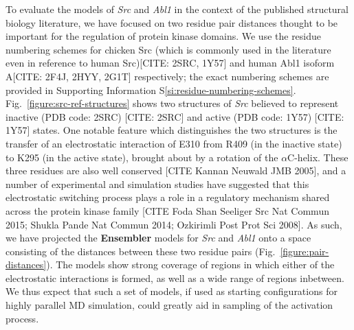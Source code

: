 \documentclass[aps,pre,twocolumn,nofootinbib,superscriptaddress,linenumbers]{revtex4-1}
\begin{document}
To evaluate the models of \emph{Src} and \emph{Abl1} in the context of the published structural biology literature, we have focused on two residue pair distances thought to be important for the regulation of protein kinase domains.
We use the residue numbering schemes for chicken Src (which is commonly used in the literature even in reference to human Src)[CITE: 2SRC, 1Y57] and human Abl1 isoform A[CITE: 2F4J, 2HYY, 2G1T] respectively; the exact numbering schemes are provided in Supporting Information S\ref{si:residue-numbering-schemes}.
Fig.~\ref{figure:src-ref-structures} shows two structures of \emph{Src} believed to represent inactive (PDB code: 2SRC) {\color{red}[CITE: 2SRC]} and active (PDB code: 1Y57) {\color{red}[CITE: 1Y57]} states.
One notable feature which distinguishes the two structures is the transfer of an electrostatic interaction of E310 from R409 (in the inactive state) to K295 (in the active state), brought about by a rotation of the $\alpha$C-helix.
These three residues are also well conserved [CITE Kannan Neuwald JMB 2005], and a number of experimental and simulation studies have suggested that this electrostatic switching process plays a role in a regulatory mechanism shared across the protein kinase family [CITE Foda Shan Seeliger Src Nat Commun 2015; Shukla Pande Nat Commun 2014; Ozkirimli Post Prot Sci 2008].
As such, we have projected the {\bf Ensembler} models for \emph{Src} and \emph{Abl1} onto a space consisting of the distances between these two residue pairs (Fig.~\ref{figure:pair-distances}).
The models show strong coverage of regions in which either of the electrostatic interactions is formed, as well as a wide range of regions inbetween.
We thus expect that such a set of models, if used as starting configurations for highly parallel MD simulation, could greatly aid in sampling of the activation process.

\end{document}

